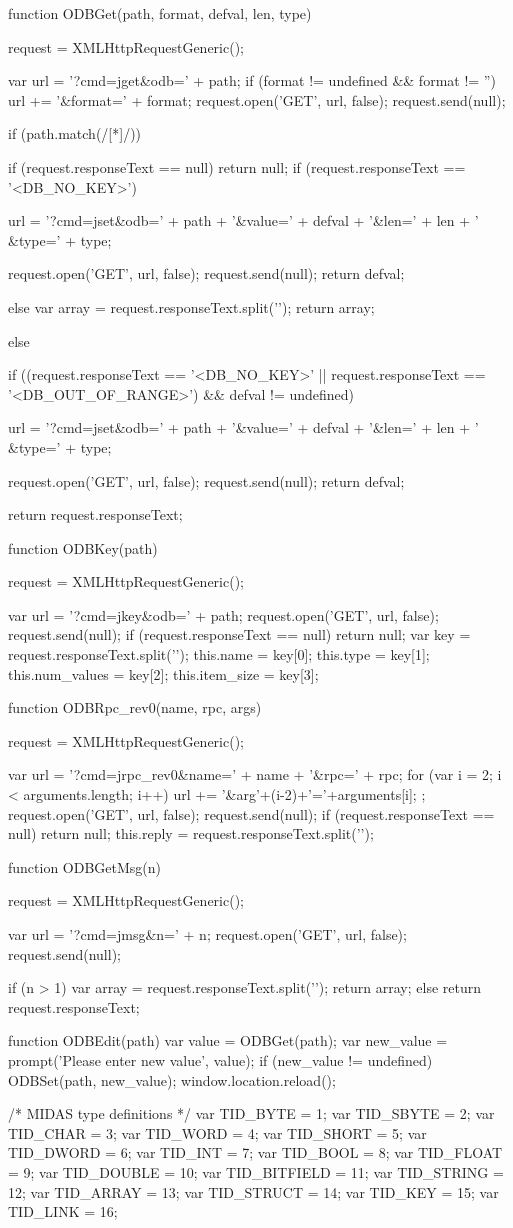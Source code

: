 \begin{DoxyCode}
function ODBGet(path, format, defval, len, type)
{
   request = XMLHttpRequestGeneric();

   var url = '?cmd=jget&odb=' + path;
   if (format != undefined && format != '')
      url += '&format=' + format;
   request.open('GET', url, false);
   request.send(null);

   if (path.match(/[*]/)) {
      if (request.responseText == null)
         return null;
     if (request.responseText == '<DB_NO_KEY>') {
         url = '?cmd=jset&odb=' + path + '&value=' + defval + '&len=' + len + '
&type=' + type;

         request.open('GET', url, false);
         request.send(null);
         return defval;
      } else {
         var array = request.responseText.split('\n');
         return array;
      }
   } else {
      if ((request.responseText == '<DB_NO_KEY>' ||
           request.responseText == '<DB_OUT_OF_RANGE>') && defval != undefined)
 {
         url = '?cmd=jset&odb=' + path + '&value=' + defval + '&len=' + len + '
&type=' + type;

         request.open('GET', url, false);
         request.send(null);
         return defval;
      }
      return request.responseText;
   }
}

function ODBKey(path)
{
   request = XMLHttpRequestGeneric();

   var url = '?cmd=jkey&odb=' + path;
   request.open('GET', url, false);
   request.send(null);
   if (request.responseText == null)
      return null;
   var key = request.responseText.split('\n');
   this.name = key[0];
   this.type = key[1];
   this.num_values = key[2];
   this.item_size = key[3];
}

function ODBRpc_rev0(name, rpc, args)
{
   request = XMLHttpRequestGeneric();

   var url = '?cmd=jrpc_rev0&name=' + name + '&rpc=' + rpc;
   for (var i = 2; i < arguments.length; i++) {
     url += '&arg'+(i-2)+'='+arguments[i];
   };
   request.open('GET', url, false);
   request.send(null);
   if (request.responseText == null)
      return null;
   this.reply = request.responseText.split('\n');
}

function ODBGetMsg(n)
{
   request = XMLHttpRequestGeneric();

   var url = '?cmd=jmsg&n=' + n;
   request.open('GET', url, false);
   request.send(null);

   if (n > 1) {
     var array = request.responseText.split('\n');
      return array;
   } else
      return request.responseText;
}

function ODBEdit(path)
{
   var value = ODBGet(path);
   var new_value = prompt('Please enter new value', value);
   if (new_value != undefined) {
      ODBSet(path, new_value);
      window.location.reload();
   }
}

/* MIDAS type definitions */
var TID_BYTE = 1;
var TID_SBYTE = 2;
var TID_CHAR = 3;
var TID_WORD = 4;
var TID_SHORT = 5;
var TID_DWORD = 6;
var TID_INT = 7;
var TID_BOOL = 8;
var TID_FLOAT = 9;
var TID_DOUBLE = 10;
var TID_BITFIELD = 11;
var TID_STRING = 12;
var TID_ARRAY = 13;
var TID_STRUCT = 14;
var TID_KEY = 15;
var TID_LINK = 16;
\end{DoxyCode}
 \label{index_end}
\hypertarget{index_end}{}
  \par
